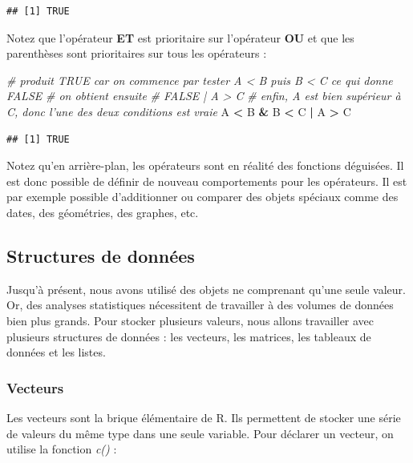 \documentclass[
  11pt,
  french,
]{book}
\makeatletter
\newenvironment{Shaded}{\begin{snugshade}}{\end{snugshade}}
\newcommand{\CommentTok}[1]{\textcolor[rgb]{0.56,0.35,0.01}{\textit{#1}}}
\newcommand{\NormalTok}[1]{#1}
\newcommand{\OperatorTok}[1]{\textcolor[rgb]{0.81,0.36,0.00}{\textbf{#1}}}
\newcommand{\StringTok}[1]{\textcolor[rgb]{0.31,0.60,0.02}{#1}}
\newenvironment{kframe}{%
\medskip{}
\setlength{\fboxsep}{.8em}
 \def\at@end@of@kframe{}%
 \ifinner\ifhmode%
  \def\at@end@of@kframe{\end{minipage}}%
  \begin{minipage}{\columnwidth}%
 \fi\fi%
 \def\FrameCommand##1{\hskip\@totalleftmargin \hskip-\fboxsep
 \colorbox{shadecolor}{##1}\hskip-\fboxsep
     \hskip-\linewidth \hskip-\@totalleftmargin \hskip\columnwidth}%
 \MakeFramed {\advance\hsize-\width
   \@totalleftmargin\z@ \linewidth\hsize
   \@setminipage}}%
 {\par\unskip\endMakeFramed%
 \at@end@of@kframe}
\renewenvironment{Shaded}{\begin{kframe}}{\end{kframe}}
\makeatother
\begin{document}
\begin{verbatim}
## [1] TRUE
\end{verbatim}

Notez que l'opérateur \textbf{ET} est prioritaire sur l'opérateur \textbf{OU} et que les parenthèses sont prioritaires sur tous les opérateurs :

\begin{Shaded}
\begin{Highlighting}[]
\CommentTok{# produit TRUE car on commence par tester A < B puis B < C ce qui donne FALSE}
\CommentTok{# on obtient ensuite}
\CommentTok{# FALSE |  A > C}
\CommentTok{# enfin, A est bien supérieur à C, donc l'une des deux conditions est vraie}
\NormalTok{A }\OperatorTok{<}\StringTok{ }\NormalTok{B }\OperatorTok{&}\StringTok{ }\NormalTok{B }\OperatorTok{<}\StringTok{ }\NormalTok{C }\OperatorTok{|}\StringTok{  }\NormalTok{A }\OperatorTok{>}\StringTok{ }\NormalTok{C}
\end{Highlighting}
\end{Shaded}

\begin{verbatim}
## [1] TRUE
\end{verbatim}

Notez qu'en arrière-plan, les opérateurs sont en réalité des fonctions déguisées. Il est donc possible de définir de nouveau comportements pour les opérateurs. Il est par exemple possible d'additionner ou comparer des objets spéciaux comme des dates, des géométries, des graphes, etc.

\hypertarget{sect0136}{%
\subsection{Structures de données}\label{sect0136}}

Jusqu'à présent, nous avons utilisé des objets ne comprenant qu'une seule valeur. Or, des analyses statistiques nécessitent de travailler à des volumes de données bien plus grands. Pour stocker plusieurs valeurs, nous allons travailler avec plusieurs structures de données : les vecteurs, les matrices, les tableaux de données et les listes.

\hypertarget{sect01361}{%
\subsubsection{Vecteurs}\label{sect01361}}

Les vecteurs sont la brique élémentaire de R. Ils permettent de stocker une série de valeurs du même type dans une seule variable. Pour déclarer un vecteur, on utilise la fonction \emph{c()} :
\end{document}
